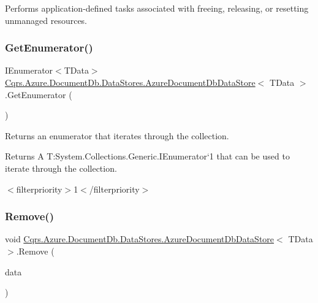 Performs application-\/defined tasks associated with freeing, releasing, or resetting unmanaged resources. 

\mbox{\label{classCqrs_1_1Azure_1_1DocumentDb_1_1DataStores_1_1AzureDocumentDbDataStore_af83791e306b51fd3ee0b710232e83756}} 
\subsubsection{\texorpdfstring{Get\+Enumerator()}{GetEnumerator()}}
{\footnotesize\ttfamily I\+Enumerator$<$T\+Data$>$ \hyperlink{classCqrs_1_1Azure_1_1DocumentDb_1_1DataStores_1_1AzureDocumentDbDataStore}{Cqrs.\+Azure.\+Document\+Db.\+Data\+Stores.\+Azure\+Document\+Db\+Data\+Store}$<$ T\+Data $>$.Get\+Enumerator (\begin{DoxyParamCaption}{ }\end{DoxyParamCaption})}



Returns an enumerator that iterates through the collection. 

\begin{DoxyReturn}{Returns}
A T\+:\+System.\+Collections.\+Generic.\+I\+Enumerator`1 that can be used to iterate through the collection. 
\end{DoxyReturn}
$<$filterpriority$>$1$<$/filterpriority$>$ \mbox{\label{classCqrs_1_1Azure_1_1DocumentDb_1_1DataStores_1_1AzureDocumentDbDataStore_abf9bcf75e8e0e1ec86155bf4da1a7b7a}} 
\subsubsection{\texorpdfstring{Remove()}{Remove()}}
{\footnotesize\ttfamily void \hyperlink{classCqrs_1_1Azure_1_1DocumentDb_1_1DataStores_1_1AzureDocumentDbDataStore}{Cqrs.\+Azure.\+Document\+Db.\+Data\+Stores.\+Azure\+Document\+Db\+Data\+Store}$<$ T\+Data $>$.Remove (\begin{DoxyParamCaption}\item[{T\+Data}]{data }\end{DoxyParamCaption})}



